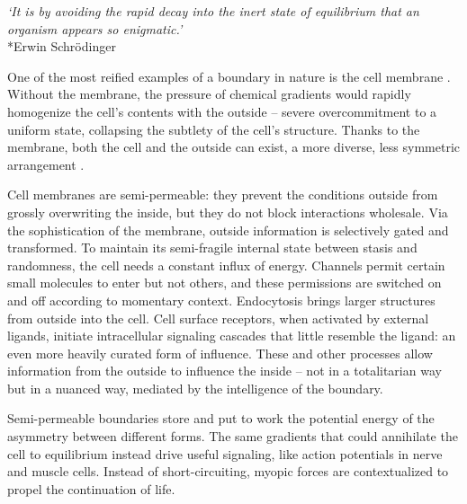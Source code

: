 \documentclass[12pt]{article}
\begin{document}
\begin{center}
\textit{`It is by avoiding the rapid decay into the inert state of equilibrium that an organism appears so enigmatic.'}\\*Erwin Schrödinger
\end{center}



One of the most reified examples of a boundary in nature is the cell membrane \citep{watson2015biological, alberts2022molecular, bray2019wetware, harold2001way, lane2015vital}. Without the membrane, the pressure of chemical gradients would rapidly homogenize the cell's contents with the outside -- severe overcommitment to a uniform state, collapsing the subtlety of the cell's structure. Thanks to the membrane, both the cell and the outside can exist, a more diverse, less symmetric arrangement \citep{schrodinger1944what, anderson1972more, prigogine1984order, turing1952chemical}. 

Cell membranes are semi-permeable: they prevent the conditions outside from grossly overwriting the inside, but they do not block interactions wholesale. Via the sophistication of the membrane, outside information is selectively gated and transformed. To maintain its semi-fragile internal state between stasis and randomness, the cell needs a constant influx of energy. Channels permit certain small molecules to enter but not others, and these permissions are switched on and off according to momentary context. Endocytosis brings larger structures from outside into the cell. Cell surface receptors, when activated by external ligands, initiate intracellular signaling cascades that little resemble the ligand: an even more heavily curated form of influence. These and other processes allow information from the outside to influence the inside -- not in a totalitarian way but in a nuanced way, mediated by the intelligence of the boundary. 

Semi-permeable boundaries store and put to work the potential energy of the asymmetry between different forms. The same gradients that could annihilate the cell to equilibrium instead drive useful signaling, like action potentials in nerve and muscle cells. Instead of short-circuiting, myopic forces are contextualized to propel the continuation of life.

\end{document}

